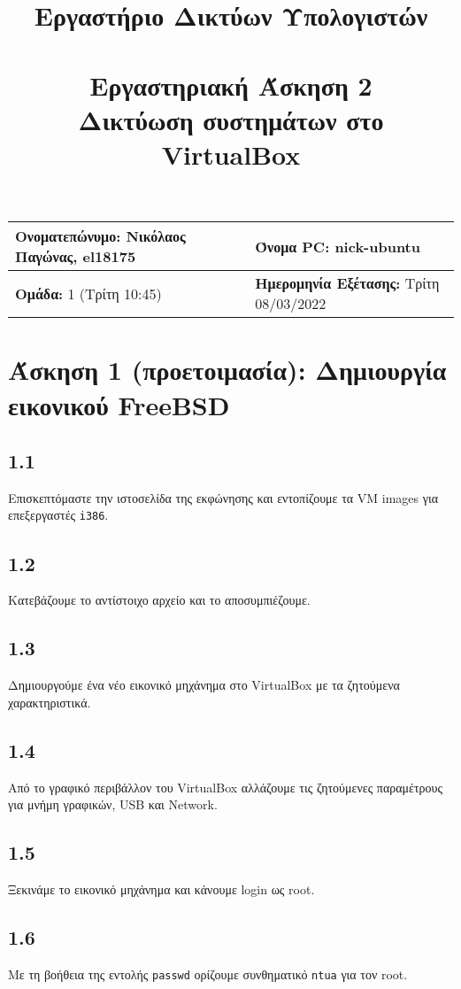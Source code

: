 \documentclass[a4paper, 12pt]{article}
\title{
	\textbf{Εργαστήριο Δικτύων Υπολογιστών} \\~\\
	Εργαστηριακή Άσκηση 2 \\ 
	Δικτύωση συστημάτων στο VirtualBox
}
\author{}
\date{}
\begin{document}
	\maketitle
	\begin{center}
	\begin{tabular}{|l|l|}
		\hline
		\textbf{Ονοματεπώνυμο:} Νικόλαος Παγώνας, el18175  & \textbf{Όνομα PC:} nick-ubuntu \\
		\hline
		\textbf{Ομάδα:} 1 (Τρίτη 10:45) & \textbf{Ημερομηνία Εξέτασης:} Τρίτη 08/03/2022 \\
		\hline
	\end{tabular}
	\end{center}

\section*{Άσκηση 1 (προετοιμασία): Δημιουργία εικονικού FreeBSD}

	\subsection*{1.1}
		Επισκεπτόμαστε την ιστοσελίδα της εκφώνησης και εντοπίζουμε τα VM images για επεξεργαστές \verb|i386|.
	
	\subsection*{1.2}
		Κατεβάζουμε το αντίστοιχο αρχείο και το αποσυμπιέζουμε.

	\subsection*{1.3}
		Δημιουργούμε ένα νέο εικονικό μηχάνημα στο VirtualBox με τα ζητούμενα χαρακτηριστικά.

	\subsection*{1.4}
		Από το γραφικό περιβάλλον του VirtualBox αλλάζουμε τις ζητούμενες παραμέτρους για μνήμη γραφικών, USB και Network.

	\subsection*{1.5}
		Ξεκινάμε το εικονικό μηχάνημα και κάνουμε login ως root.

	\subsection*{1.6}
		Με τη βοήθεια της εντολής \verb|passwd| ορίζουμε συνθηματικό \verb|ntua| για τον root.
\end{document}

